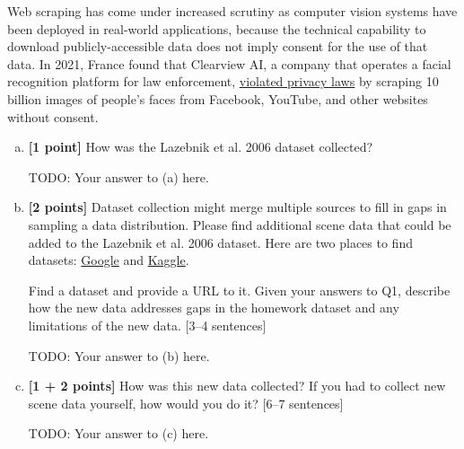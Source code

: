 Web scraping has come under increased scrutiny as computer vision systems have been deployed in real-world applications, because the technical capability to download publicly-accessible data does not imply consent for the use of that data. In 2021, France found that Clearview AI, a company that operates a facial recognition platform for law enforcement, \href{https://techcrunch.com/2021/12/16/clearview-gdpr-breaches-france/}{violated privacy laws} by scraping 10 billion images of people's faces from Facebook, YouTube, and other websites without consent.

\begin{enumerate}[(a)]
    \item \textbf{[1 point]}
How was the Lazebnik et al. 2006 dataset collected?

\begin{mdframed}
TODO: Your answer to (a) here.
\end{mdframed}

\item \textbf{[2 points]} 
Dataset collection might merge multiple sources to fill in gaps in sampling a data distribution. Please find additional scene data that could be added to the Lazebnik et al. 2006 dataset. Here are two places to find datasets: \href{https://datasetsearch.research.google.com}{Google} and \href{https://www.kaggle.com}{Kaggle}. 

Find a dataset and provide a URL to it. Given your answers to Q1, describe how the new data addresses gaps in the homework dataset and any limitations of the new data. [3--4 sentences] 
\begin{mdframed}
TODO: Your answer to (b) here.
\end{mdframed}

\item \textbf{[1 + 2 points]} How was this new data collected? If you had to collect new scene data yourself, how would you do it? [6--7 sentences]
\begin{mdframed}
TODO: Your answer to (c) here.
\end{mdframed}
\end{enumerate}





